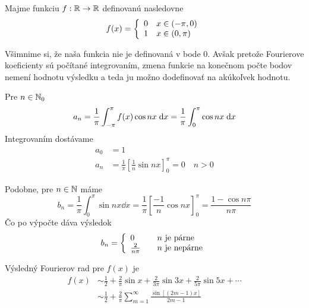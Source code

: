 \begin{priklad}
Majme funkciu $f:{\mathbb R}\rightarrow{\mathbb R}$ definovanú nasledovne
    \begin{equation*}
        f(x) = \left\{
            \begin{array}{l l}
                0 \quad x \in (-\pi,0) \\
                1 \quad x \in (0,\pi)
            \end{array}
        \right.
    \end{equation*}
    
    \begin{poznamka}
        Všimnime si, že naša funkcia nie je definovaná v bode 0.
        Avšak pretože Fourierove koeficienty sú počítané integrovaním,
        zmena funkcie na konečnom počte bodov nemení hodnotu výsledku
        a teda ju možno dodefinovať na akúkoľvek hodnotu.
    \end{poznamka}

    Pre $n \in \mathbb{N}_0$
    \begin{equation}
        a_n = \frac{1}{\pi} \int_{-\pi}^{\pi} f(x) \cos nx \; \mathrm{d} x =
        \frac{1}{\pi} \int_0^{\pi} \cos nx \; \mathrm{d} x
    \end{equation}
    Integrovaním dostávame
    \begin{equation*}
    \begin{split}
        a_0 &= 1 \\
        a_n &= \frac{1}{\pi} \left[ \frac{1}{n} \sin nx
        \right]_0^{\pi} = 0 \quad n>0        
    \end{split}
    \end{equation*}

    Podobne, pre $n\in \mathbb{N}$ máme
    \begin{equation*}
        b_n = \frac{1}{\pi} \int_0^{\pi} \sin nx \dd x =
           \frac{1}{\pi} \left[ \frac{-1}{n} \cos nx \right]_0^{\pi} =
           \frac{1 - \cos n\pi}{n\pi}
    \end{equation*}
    Čo po výpočte dáva výsledok
    \begin{equation*}
        b_n = \left\{
                \begin{array}{l l}
                    0 \quad & n \text{ je párne} \\
                    \frac{2}{n\pi}  \quad &n \text{ je nepárne}
                \end{array}
            \right.
    \end{equation*}

    Výsledný Fourierov rad pre $f(x)$ je 
    \begin{equation*}
    \begin{split}
        f(x) &\sim \frac{1}{2} + \frac{2}{\pi} \sin x + \frac{2}{3\pi}
            \sin 3x + \frac{2}{5\pi} \sin 5x + \cdots \\
            &\sim \frac{1}{2} + \frac{2}{\pi} \sum_{m=1}^{\infty}
                \frac{\sin\left[ (2m-1) x\right]}{2m-1}
    \end{split}
    \end{equation*}


\end{priklad}
